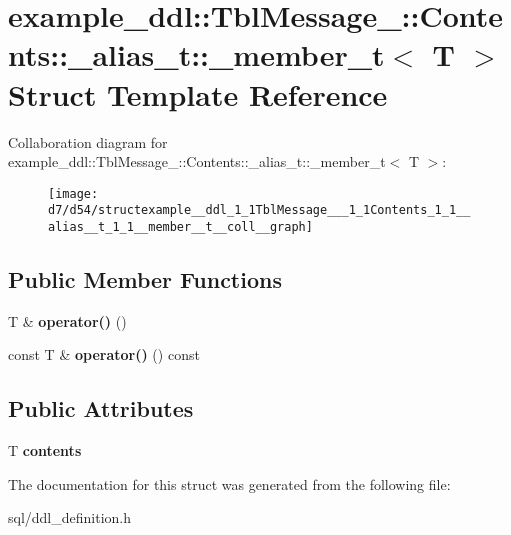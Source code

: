 \hypertarget{structexample__ddl_1_1TblMessage___1_1Contents_1_1__alias__t_1_1__member__t}{}\section{example\+\_\+ddl\+:\+:Tbl\+Message\+\_\+\+:\+:Contents\+:\+:\+\_\+alias\+\_\+t\+:\+:\+\_\+member\+\_\+t$<$ T $>$ Struct Template Reference}
\label{structexample__ddl_1_1TblMessage___1_1Contents_1_1__alias__t_1_1__member__t}


Collaboration diagram for example\+\_\+ddl\+:\+:Tbl\+Message\+\_\+\+:\+:Contents\+:\+:\+\_\+alias\+\_\+t\+:\+:\+\_\+member\+\_\+t$<$ T $>$\+:
\nopagebreak
\begin{figure}[H]
\begin{center}
\leavevmode
\texttt{[image: d7/d54/structexample\_\_ddl\_1\_1TblMessage\_\_\_1\_1Contents\_1\_1\_\_alias\_\_t\_1\_1\_\_member\_\_t\_\_coll\_\_graph]}
\end{center}
\end{figure}
\subsection*{Public Member Functions}
\begin{DoxyCompactItemize}
\item 
\hypertarget{structexample__ddl_1_1TblMessage___1_1Contents_1_1__alias__t_1_1__member__t_a9728876e472b3fae4b699896e5f3a854}{}T \& {\bfseries operator()} ()\label{structexample__ddl_1_1TblMessage___1_1Contents_1_1__alias__t_1_1__member__t_a9728876e472b3fae4b699896e5f3a854}

\item 
\hypertarget{structexample__ddl_1_1TblMessage___1_1Contents_1_1__alias__t_1_1__member__t_a8eb25e410762b9561aeaac06ed94a940}{}const T \& {\bfseries operator()} () const \label{structexample__ddl_1_1TblMessage___1_1Contents_1_1__alias__t_1_1__member__t_a8eb25e410762b9561aeaac06ed94a940}

\end{DoxyCompactItemize}
\subsection*{Public Attributes}
\begin{DoxyCompactItemize}
\item 
\hypertarget{structexample__ddl_1_1TblMessage___1_1Contents_1_1__alias__t_1_1__member__t_aed24ff9c42329cb2e04d015ac3055f52}{}T {\bfseries contents}\label{structexample__ddl_1_1TblMessage___1_1Contents_1_1__alias__t_1_1__member__t_aed24ff9c42329cb2e04d015ac3055f52}

\end{DoxyCompactItemize}


The documentation for this struct was generated from the following file\+:\begin{DoxyCompactItemize}
\item 
sql/ddl\+\_\+definition.\+h\end{DoxyCompactItemize}
